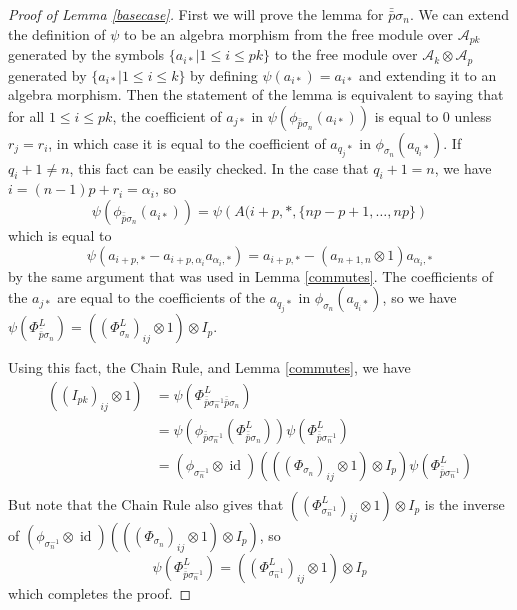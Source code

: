 \documentclass[11pt]{amsart}
\def\ltblue{blue!20!white}
\def\A{{\mathcal A}}
\def\s{{\sigma}}
\def\a{\alpha}
\def\fp{{\scriptstyle \bar{\bar{p}}}}
\newcommand\id{\operatorname{id}}
\theoremstyle{definition}
\begin{document}
\begin{proof} [Proof of Lemma \ref{basecase}]\todo[color=\ltblue]{check}
First we will prove the lemma for $\fp \s_n$.  We can extend the definition of $\psi$ to be an algebra morphism from the free module over $\A_{pk}$ generated by the symbols $\{a_{i*}|1\le i\le pk\}$ to the free module over $\A_{k}\otimes \A_{p}$ generated by $\{a_{i*}|1\le i\le k\}$ by defining $\psi(a_{i*}) = a_{i*}$ and extending it to an algebra morphism.  Then the statement of the lemma is equivalent to saying that for all $1\le i\le pk$, the coefficient of $a_{j*}$ in $\psi\left(\phi_{\fp \s_n}(a_{i*})\right)$ is equal to 0 unless $r_j = r_i$, in which case it is equal to the coefficient of $a_{q_j*}$ in $\phi_{\s_n}(a_{q_i*})$.  If $q_i + 1 \ne n$, this fact can be easily checked.  In the case that $q_i + 1 = n$, we have $i = (n-1)p + r_i = \a_i$, so
$$\psi\left(\phi_{\fp \s_n}(a_{i*})\right) = \psi\left(A(i+p,*,\{np-p+1,\ldots,np\}\right)$$
\noindent which is equal to
$$\psi(a_{i+p,*} - a_{i+p,\a_i}a_{\a_i,*}) = a_{i+p,*} - (a_{n+1,n}\otimes 1)a_{\a_i,*}$$
by the same argument that was used in Lemma \ref{commutes}.  The coefficients of the $a_{j*}$ are equal to the coefficients of the $a_{q_j*}$ in $\phi_{\s_n}(a_{q_i*})$, so we have $\psi\left(\Phi_{\fp \s_n}^L\right) = \left(\left(\Phi_{\s_n}^L\right)_{ij}\otimes 1\right)\otimes I_p$.

Using this fact, the Chain Rule, and Lemma \ref{commutes}, we have
\begin{align*}
\left(\left(I_{pk}\right)_{ij}\otimes 1\right) &= \psi\left(\Phi_{\fp \s^{-1}_n\fp \s_n}^L\right)\\
&= \psi\left(\phi_{\fp \s^{-1}_n}\left(\Phi_{\fp \s_n}^L\right)\right)\psi\left(\Phi_{\fp \s^{-1}_n}^L\right)\\
&= \left(\phi_{\s_n^{-1}}\otimes \id\right)\left(\left(\left(\Phi_{\s_n}\right)_{ij}\otimes 1\right)\otimes I_p\right)\psi\left(\Phi_{\fp \s^{-1}_n}^L\right)\\
\end{align*}
But note that the Chain Rule also gives that $\left(\left(\Phi_{\s_n^{-1}}^L\right)_{ij}\otimes 1\right)\otimes I_p$ is the inverse of $\left(\phi_{\s_n^{-1}}\otimes \id\right)\left(\left(\left(\Phi_{\s_n}\right)_{ij}\otimes 1\right)\otimes I_p\right)$, so 
$$\psi\left(\Phi_{\fp \s^{-1}_n}^L\right) = \left(\left(\Phi_{\s_n^{-1}}^L\right)_{ij}\otimes 1\right)\otimes I_p$$
\noindent which completes the proof.
\end{proof}
\end{document}
